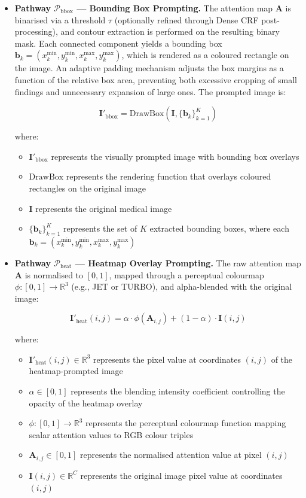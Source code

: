 \begin{itemize}

    \item \textbf{Pathway $\mathcal{P}_{\text{bbox}}$ --- Bounding Box Prompting.} The attention map $\mathbf{A}$ is binarised via a threshold $\tau$ (optionally refined through Dense CRF post-processing), and contour extraction is performed on the resulting binary mask. Each connected component yields a bounding box $\mathbf{b}_k = (x_k^{\min}, y_k^{\min}, x_k^{\max}, y_k^{\max})$, which is rendered as a coloured rectangle on the image. An adaptive padding mechanism adjusts the box margins as a function of the relative box area, preventing both excessive cropping of small findings and unnecessary expansion of large ones. The prompted image is:

    \[
    \mathbf{I}'_{\text{bbox}} = \text{DrawBox}(\mathbf{I}, \{\mathbf{b}_k\}_{k=1}^{K})
    \]

    where:
    \begin{itemize}
    \item $\mathbf{I}'_{\text{bbox}}$ represents the visually prompted image with bounding box overlays
    \item $\text{DrawBox}$ represents the rendering function that overlays coloured rectangles on the original image
    \item $\mathbf{I}$ represents the original medical image
    \item $\{\mathbf{b}_k\}_{k=1}^{K}$ represents the set of $K$ extracted bounding boxes, where each $\mathbf{b}_k = (x_k^{\min}, y_k^{\min}, x_k^{\max}, y_k^{\max})$
    \end{itemize}

    \item \textbf{Pathway $\mathcal{P}_{\text{heat}}$ --- Heatmap Overlay Prompting.} The raw attention map $\mathbf{A}$ is normalised to $[0, 1]$, mapped through a perceptual colourmap $\phi : [0,1] \to \mathbb{R}^3$ (e.g., JET or TURBO), and alpha-blended with the original image:

    \[
    \mathbf{I}'_{\text{heat}}(i,j) = \alpha \cdot \phi\!\left(\mathbf{A}_{i,j}\right) + (1 - \alpha) \cdot \mathbf{I}(i,j)
    \]

    where:
    \begin{itemize}
    \item $\mathbf{I}'_{\text{heat}}(i,j) \in \mathbb{R}^3$ represents the pixel value at coordinates $(i,j)$ of the heatmap-prompted image
    \item $\alpha \in [0, 1]$ represents the blending intensity coefficient controlling the opacity of the heatmap overlay
    \item $\phi : [0,1] \to \mathbb{R}^3$ represents the perceptual colourmap function mapping scalar attention values to RGB colour triples
    \item $\mathbf{A}_{i,j} \in [0,1]$ represents the normalised attention value at pixel $(i,j)$
    \item $\mathbf{I}(i,j) \in \mathbb{R}^C$ represents the original image pixel value at coordinates $(i,j)$
    \end{itemize}


\end{itemize}
